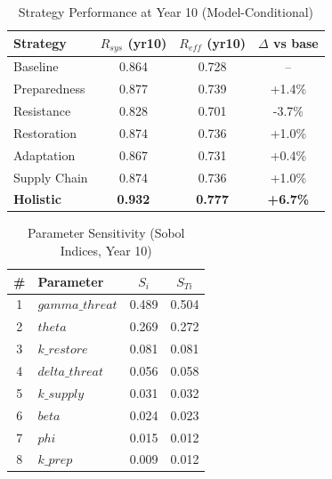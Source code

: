 \begin{table}[!t]
\centering
\caption{Strategy Performance at Year 10 (Model-Conditional)}
\label{tab:strategy_live}
\scriptsize
\renewcommand{\arraystretch}{1.15}
\begin{tabular}{lccc}
\toprule
\textbf{Strategy} & \textbf{$R_{sys}$ (yr10)} & \textbf{$R_{eff}$ (yr10)} & \textbf{$\Delta$ vs base} \\
\midrule
Baseline & 0.864 & 0.728 & -- \\
Preparedness & 0.877 & 0.739 & +1.4\% \\
Resistance & 0.828 & 0.701 & -3.7\% \\
Restoration & 0.874 & 0.736 & +1.0\% \\
Adaptation & 0.867 & 0.731 & +0.4\% \\
Supply Chain & 0.874 & 0.736 & +1.0\% \\
\textbf{Holistic} & \textbf{0.932} & \textbf{0.777} & \textbf{+6.7\%} \\
\bottomrule
\end{tabular}
\end{table}

\begin{table}[!t]
\centering
\caption{Parameter Sensitivity (Sobol Indices, Year 10)}
\label{tab:sobol_live}
\scriptsize
\renewcommand{\arraystretch}{1.15}
\begin{tabular}{clcc}
\toprule
\textbf{\#} & \textbf{Parameter} & \textbf{$S_i$} & \textbf{$S_{Ti}$} \\
\midrule
1 & $gamma\_threat$ & 0.489 & 0.504 \\
2 & $theta$ & 0.269 & 0.272 \\
3 & $k\_restore$ & 0.081 & 0.081 \\
4 & $delta\_threat$ & 0.056 & 0.058 \\
5 & $k\_supply$ & 0.031 & 0.032 \\
6 & $beta$ & 0.024 & 0.023 \\
7 & $phi$ & 0.015 & 0.012 \\
8 & $k\_prep$ & 0.009 & 0.012 \\
\bottomrule
\end{tabular}
\end{table}

